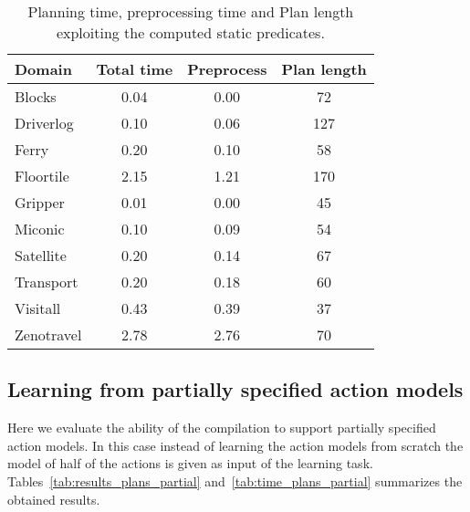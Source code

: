 \documentclass[letterpaper]{article} %
\begin{document}
\begin{table}[hbt!]
\begin{footnotesize}
	\begin{center}
		\begin{tabular}{l|c|c|c|}			
			Domain & Total time & Preprocess & Plan length  \\
			\hline
			Blocks & 0.04 & 0.00 & 72 \\
			Driverlog & 0.10 & 0.06 & 127 \\
			Ferry & 0.20 & 0.10 & 58 \\
			Floortile & 2.15 & 1.21 & 170 \\
			Gripper & 0.01 & 0.00 & 45 \\
			Miconic & 0.10 & 0.09 & 54 \\
			Satellite & 0.20 & 0.14 & 67 \\
			Transport & 0.20 & 0.18 & 60 \\
			Visitall & 0.43 & 0.39 & 37 \\
			Zenotravel & 2.78 & 2.76 & 70
		\end{tabular}
	\end{center}
        \end{footnotesize}
	\caption{\small Planning time, preprocessing time and Plan length exploiting the computed static predicates.}
	\label{tab:time_plans_static}	
\end{table}

\subsection{Learning from partially specified action models}

Here we evaluate the ability of the compilation to support partially specified action models. In this case instead of learning the action models from scratch the model of half of the actions is given as input of the learning task. Tables~\ref{tab:results_plans_partial} and~\ref{tab:time_plans_partial} summarizes the obtained results.	
\end{document}
